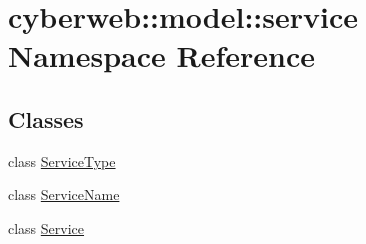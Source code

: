 \hypertarget{namespacecyberweb_1_1model_1_1service}{\section{cyberweb\-:\-:model\-:\-:service \-Namespace \-Reference}
\label{namespacecyberweb_1_1model_1_1service}
}
\subsection*{\-Classes}
\begin{DoxyCompactItemize}
\item 
class \hyperlink{classcyberweb_1_1model_1_1service_1_1_service_type}{\-Service\-Type}
\item 
class \hyperlink{classcyberweb_1_1model_1_1service_1_1_service_name}{\-Service\-Name}
\item 
class \hyperlink{classcyberweb_1_1model_1_1service_1_1_service}{\-Service}
\end{DoxyCompactItemize}
